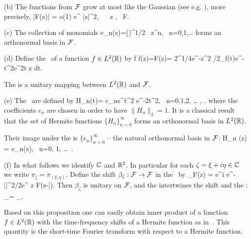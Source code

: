 \documentclass[12pt]{amsart}
\begin{document}
(b) The  functions from  $  \mathcal{F}$ grow at most  like the  Gaussian
  (see e.g. \cite{LyuSe}),  more precisely,  
\beq
\label{growth_estimate}
|F(z)| = o(1) e^{\frac {} |z|^2}, \  \ z \to \infty, \ F\in \cF.
\eeq

(c) The collection  of monomials 
\beq
\label{monomials}
e_n(z)=\Big(\Big)^{1/2} \, z^n, \ n=0,1,\ldots
\eeq 
forms an orthonormal basis in $\mathcal{F}$. 

(d) Define the \BT\ of a function $f\in L^2(\mathbb{R})$  by %
\beq
 \label{bt}
  f \mapsto \cB f(z)=F(z)= 2^{1/4}e^{-\pi z^2 /2}\int_\bR f(t)e^{-\pi
    t^2}e^{2\pi t z} dt. 
  \eeq
% 


\begin{prop}
\label{unitary}
The \BT is a unitary mapping between $L^2(\mathbb{R})$ and $\mathcal{F}$. 
\end{prop}

(e) The  \HFS\  are defined by  
\beq
\label{HFS}
H_n(t)= c_ne^{\pi t^2}  e^{-2\pi t^2}, \ n=0,1,2, \dots
, .
\eeq   
where the coefficients $c_n$ are chosen in order to have $\|H_n\|_2=1$. 
It  is a classical result that  the set of Hermite functions
$\{H_n\}_{n=0}^\infty$ forms an  orthonormal basis in  $L^2(\mathbb{R})$. 
 

Their image under the \BT is $\{e_n\}_{n=0}^\infty$  -- the natural orthonormal basis in $\mathcal{F}$:
\beq
\label{image}
\cB H_n (z) = e_n(z), \ n=0, 1, \ldots \ .
\eeq
 

(f) In what follows we  identify $\mathbb{C}$ and $\mathbb{R}^2$. In particular
for each $\zeta=\xi +i\eta \in \mathbb{C}$ we write 
$\pi_\zeta=\pi_{(\xi,\eta)}$. 
 Define the shift $\beta_\zeta: \mathcal{F} \to \mathcal{F}$ in the \FS\  by
\beq
\label{fock_shift}
 \beta_\zeta F(z) = e^{i\pi \xi \eta} e^{-\pi |\zeta|^2/2}e^{\pi {\zeta} z} F(z-\bar{\zeta}).
 \eeq
Then $\beta _\zeta $ is unitary on $\mathcal{F} $,  and the   \BT intertwines
the \FS shift and the \TFS: 
\beq
\label{intertwines}
\beta_\zeta \cB = \cB \pi_\zeta.
\eeq
 

Based on this proposition one can easily obtain inner product of a
function $f\in L^2(\mathbb{R})$ with the time-frequency   shifts of a  
Hermite function as in~\cite{BS93}. This quantity is    the
short-time Fourier 
transform with respect to a  Hermite function. 
\end{document}
